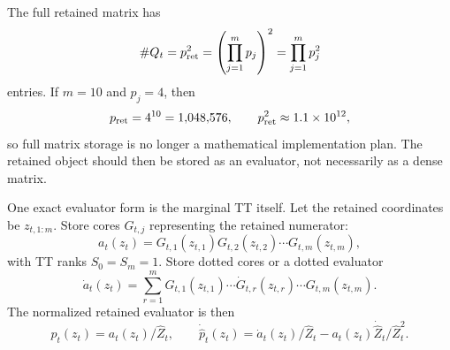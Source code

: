 \documentclass[11pt]{article}
\numberwithin{equation}{section}
\begin{document}
The full retained matrix has
\begin{equation}
    \#Q_t=p_{\rm ret}^2
    =
    \left(\prod_{j=1}^{m}p_j\right)^2
    =
    \prod_{j=1}^{m}p_j^2
    \label{eq:p26-retained-storage-1}
\end{equation}
entries.  If \(m=10\) and \(p_j=4\), then
\begin{equation}
    p_{\rm ret}=4^{10}=1{,}048{,}576,
    \qquad
    p_{\rm ret}^2\approx 1.1\times10^{12},
    \label{eq:p26-retained-storage-2}
\end{equation}
so full matrix storage is no longer a mathematical implementation plan.  The
retained object should then be stored as an evaluator, not necessarily as a
dense matrix.

One exact evaluator form is the marginal TT itself.  Let the retained
coordinates be \(z_{t,1:m}\).  Store cores \(G_{t,j}\) representing the
retained numerator:
\begin{equation}
    a_t(z_t)
    =
    G_{t,1}(z_{t,1})G_{t,2}(z_{t,2})\cdots G_{t,m}(z_{t,m}),
    \label{eq:p26-retained-storage-3}
\end{equation}
with TT ranks \(S_0=S_m=1\).  Store dotted cores or a dotted evaluator
\begin{equation}
    \dot a_t(z_t)
    =
    \sum_{r=1}^{m}
    G_{t,1}(z_{t,1})\cdots
    \dot G_{t,r}(z_{t,r})\cdots
    G_{t,m}(z_{t,m}).
    \label{eq:p26-retained-storage-4}
\end{equation}
The normalized retained evaluator is then
\begin{equation}
    \widehat p_t(z_t)=a_t(z_t)/\widehat Z_t,
    \qquad
    \dot{\widehat p}_t(z_t)
    =
    \dot a_t(z_t)/\widehat Z_t
    -
    a_t(z_t)\dot{\widehat Z}_t/\widehat Z_t^2.
    \label{eq:p26-retained-storage-5}
\end{equation}
\end{document}
